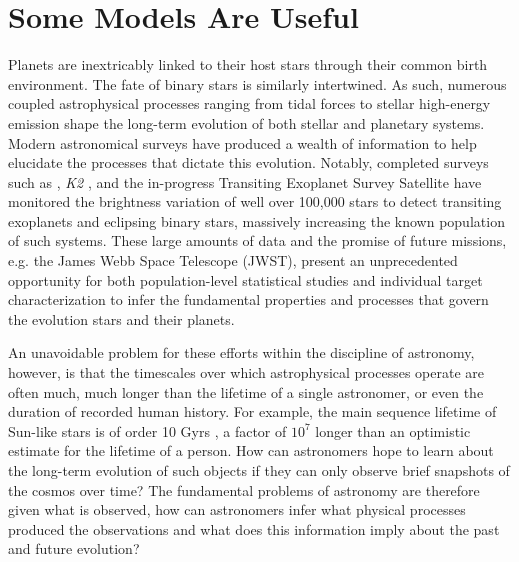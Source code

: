 
\section{Some Models Are Useful}

Planets are inextricably linked to their host stars through their common birth environment. The fate of binary stars is similarly intertwined.  As such, numerous coupled astrophysical processes ranging from tidal forces \citep{Zahn1989,Barnes2017} to stellar high-energy emission \citep{Airapetian2019} shape the long-term evolution of both stellar and planetary systems. Modern astronomical surveys have produced a wealth of information to help elucidate the processes that dictate this evolution. Notably, completed surveys such as \kepler \citep{Borucki2003,Borucki2010}, \textit{K2} \citep{Howell2014}, and the in-progress Transiting Exoplanet Survey Satellite \citep[TESS, ][]{Ricker2014} have monitored the brightness variation of well over 100,000 stars to detect transiting exoplanets and eclipsing binary stars, massively increasing the known population of such systems.  These large amounts of data and the promise of future missions, e.g. the James Webb Space Telescope (JWST), present an unprecedented opportunity for both population-level statistical studies and individual target characterization to infer the fundamental properties and processes that govern the evolution stars and their planets.

An unavoidable problem for these efforts within the discipline of astronomy, however, is that the timescales over which astrophysical processes operate are often much, much longer than the lifetime of a single astronomer, or even the duration of recorded human history. For example, the main sequence lifetime of Sun-like stars is of order 10 Gyrs \citep{Baraffe2015}, a factor of $10^7$ longer than an optimistic estimate for the lifetime of a person. How can astronomers hope to learn about the long-term evolution of such objects if they can only observe brief snapshots of the cosmos over time? The fundamental problems of astronomy are therefore given what is observed, how can astronomers infer what physical processes produced the observations and what does this information imply about the past and future evolution? 

